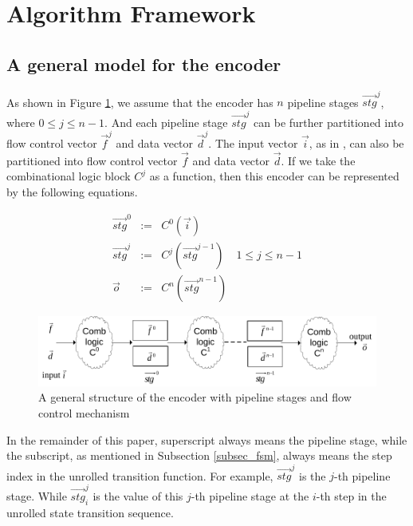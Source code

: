 \documentclass[runningheads,a4paper,orivec]{llncs}
\begin{document}
\section{Algorithm Framework}\label{sec_framework}


\subsection{A general model for the encoder}
As shown in Figure \ref{fig_pipeenc},
we assume that 
the encoder has $n$ pipeline stages $\vec{stg}^j$,
where $0\le j \le n-1$.
And each pipeline stage $\vec{stg}^j$ can be further partitioned into flow control vector $\vec{f}^j$ and data vector $\vec{d}^j$.
The input vector $\vec{i}$,
as in \cite{QinTODAES15},
can also be partitioned into flow control vector $\vec{f}$ and data vector $\vec{d}$.
If we take the combinational logic block $C^j$ as a function,
then this encoder can be represented by the following equations.

\begin{equation}\label{equ_genpipe}
\begin{array}{cccc}
\vec{stg}^0   & := & C^0(\vec{i})         &\\
\vec{stg}^j   & := & C^j(\vec{stg}^{j-1}) & 1\le j\le n-1\\
\vec{o}       & := & C^n(\vec{stg}^{n-1}) &
\end{array}
\end{equation}


\begin{figure}[b]
\begin{center}
\includegraphics[width=\textwidth]{pipemod1}
\end{center}
\caption{A general structure of the encoder with pipeline stages and flow control mechanism}
  \label{fig_pipeenc}
\end{figure}



In the remainder of this paper,
superscript always means the pipeline stage,
while the subscript,
as mentioned in Subsection \ref{subsec_fsm},
always means the step index in the unrolled transition function.
For example,
$\vec{stg}^j$ is the $j$-th pipeline stage.
While $\vec{stg}^j_i$ is the value of this $j$-th pipeline stage 
at the $i$-th step in the unrolled state transition sequence.
\end{document}
